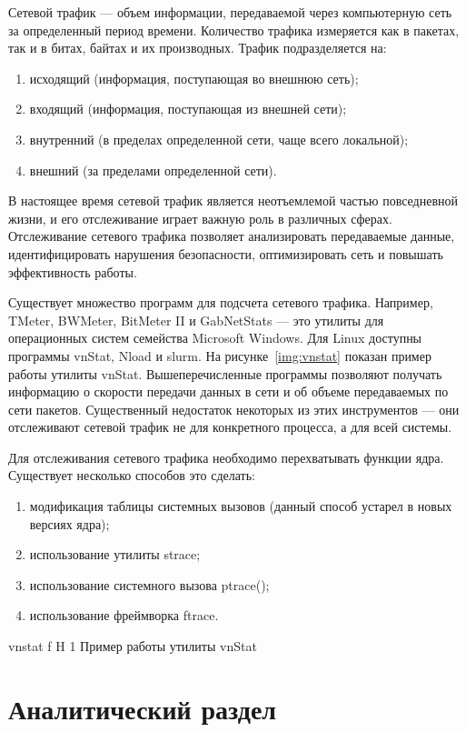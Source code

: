 \documentclass{bmstu}
\begin{document}
Сетевой трафик --- объем информации, передаваемой через компьютерную сеть за определенный период времени. 
Количество трафика измеряется как в пакетах, так и в битах, байтах и их производных. 
Трафик подразделяется на:
\begin{enumerate}
\item[1)] исходящий (информация, поступающая во внешнюю сеть);
\item[2)] входящий (информация, поступающая из внешней сети);
\item[3)] внутренний (в пределах определенной сети, чаще всего локальной);
\item[4)] внешний (за пределами определенной сети).
\end{enumerate}

В настоящее время сетевой трафик является неотъемлемой частью повседневной жизни, и его отслеживание играет важную роль в различных сферах. Отслеживание сетевого трафика позволяет анализировать передаваемые данные, идентифицировать нарушения безопасности, оптимизировать сеть и повышать эффективность работы.

Существует множество программ для подсчета сетевого трафика. 
Например, TMeter, BWMeter, BitMeter II и GabNetStats --- это утилиты для операционных систем семейства Microsoft Windows. 
Для Linux доступны программы vnStat, Nload и slurm. 
На рисунке~\ref{img:vnstat} показан пример работы утилиты vnStat.
Вышеперечисленные программы позволяют получать информацию о скорости передачи данных в сети и об объеме передаваемых по сети пакетов. 
Существенный недостаток некоторых из этих инструментов --- они отслеживают сетевой трафик не для конкретного процесса, а для всей системы.

Для отслеживания сетевого трафика необходимо перехватывать функции ядра. 
Существует несколько способов это сделать:
\begin{enumerate}
\item[1)] модификация таблицы системных вызовов (данный способ устарел в новых версиях ядра);
\item[2)] использование утилиты strace;
\item[3)] использование системного вызова ptrace();
\item[4)] использование фреймворка ftrace.
\end{enumerate}

    {vnstat}
    {f}
    {H}
    {1\textwidth}
    {Пример работы утилиты vnStat}

\chapter{Аналитический раздел}
\end{document}
